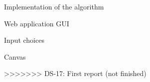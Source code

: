 \documentclass[9pt]{extarticle}
\begin{document}
\begin{section}{Implementation of the algorithm}
\begin{subsection}{Web application GUI}
\begin{subsubsection}{Input choices}



            \end{subsubsection}

            \begin{subsubsection}{Canvas}
            \end{subsubsection}
            
>>>>>>> DS-17: First report (not finished)


\end{subsection}
\end{section}
\end{document}
